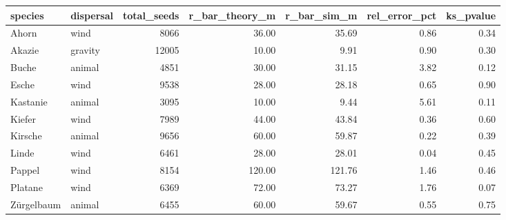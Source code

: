 \begin{tabular}{llrrrrr}
\toprule
species & dispersal & total_seeds & r_bar_theory_m & r_bar_sim_m & rel_error_pct & ks_pvalue \\
\midrule
Ahorn & wind & 8066 & 36.00 & 35.69 & 0.86 & 0.34 \\
Akazie & gravity & 12005 & 10.00 & 9.91 & 0.90 & 0.30 \\
Buche & animal & 4851 & 30.00 & 31.15 & 3.82 & 0.12 \\
Esche & wind & 9538 & 28.00 & 28.18 & 0.65 & 0.90 \\
Kastanie & animal & 3095 & 10.00 & 9.44 & 5.61 & 0.11 \\
Kiefer & wind & 7989 & 44.00 & 43.84 & 0.36 & 0.60 \\
Kirsche & animal & 9656 & 60.00 & 59.87 & 0.22 & 0.39 \\
Linde & wind & 6461 & 28.00 & 28.01 & 0.04 & 0.45 \\
Pappel & wind & 8154 & 120.00 & 121.76 & 1.46 & 0.46 \\
Platane & wind & 6369 & 72.00 & 73.27 & 1.76 & 0.07 \\
Zürgelbaum & animal & 6455 & 60.00 & 59.67 & 0.55 & 0.75 \\
\bottomrule
\end{tabular}
